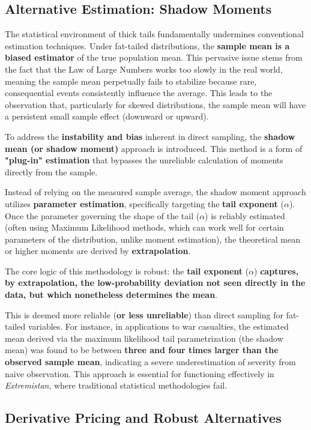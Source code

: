 \documentclass{ieeetj}
\begin{document}
\subsection{Alternative Estimation: Shadow Moments}

The statistical environment of thick tails fundamentally undermines conventional estimation techniques. Under fat-tailed distributions, the \textbf{sample mean is a biased estimator} of the true population mean. This pervasive issue stems from the fact that the Law of Large Numbers works too slowly in the real world, meaning the sample mean perpetually fails to stabilize because rare, consequential events consistently influence the average. This leads to the observation that, particularly for skewed distributions, the sample mean will have a persistent small sample effect (downward or upward).

To address the \textbf{instability and bias} inherent in direct sampling, the \textbf{shadow mean (or shadow moment)} approach is introduced. This method is a form of\textbf{ "plug-in" estimation} that bypasses the unreliable calculation of moments directly from the sample.

Instead of relying on the measured sample average, the shadow moment approach utilizes \textbf{parameter estimation}, specifically targeting the \textbf{tail exponent} ($\alpha$). Once the parameter governing the shape of the tail ($\alpha$) is reliably estimated (often using Maximum Likelihood methods, which can work well for certain parameters of the distribution, unlike moment estimation), the theoretical mean or higher moments are derived by \textbf{extrapolation}.

The core logic of this methodology is robust: the \textbf{tail exponent} ($\alpha$) \textbf{captures, by extrapolation, the low-probability deviation not seen directly in the data, but which nonetheless determines the mean}.

This is deemed more reliable (\textbf{or less unreliable}) than direct sampling for fat-tailed variables. For instance, in applications to war casualties, the estimated mean derived via the maximum likelihood tail parametrization (the shadow mean) was found to be between\textbf{ three and four times larger than the observed sample mean}, indicating a severe underestimation of severity from naive observation. This approach is essential for functioning effectively in \textit{Extremistan}, where traditional statistical methodologies fail.

\subsection{Derivative Pricing and Robust Alternatives}
\end{document}
